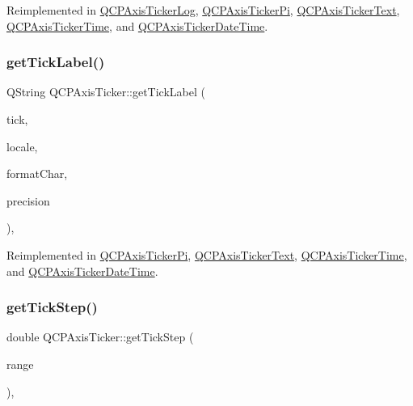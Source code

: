 Reimplemented in \mbox{\hyperlink{class_q_c_p_axis_ticker_log_a352fef7ae68837acd26e35188aa86167}{Q\+C\+P\+Axis\+Ticker\+Log}}, \mbox{\hyperlink{class_q_c_p_axis_ticker_pi_a56c90f870da97c8670cfae4d04ff3ac7}{Q\+C\+P\+Axis\+Ticker\+Pi}}, \mbox{\hyperlink{class_q_c_p_axis_ticker_text_a9c2488b877776870239abda4c8106052}{Q\+C\+P\+Axis\+Ticker\+Text}}, \mbox{\hyperlink{class_q_c_p_axis_ticker_time_acace84c46598176aa53837e147595471}{Q\+C\+P\+Axis\+Ticker\+Time}}, and \mbox{\hyperlink{class_q_c_p_axis_ticker_date_time_a78dece0d51426a3c310528d413e09193}{Q\+C\+P\+Axis\+Ticker\+Date\+Time}}.

\mbox{\label{class_q_c_p_axis_ticker_a8201eb4aa8be192bf786b126eb5ee089}} 
\subsubsection{\texorpdfstring{getTickLabel()}{getTickLabel()}}
{\footnotesize\ttfamily Q\+String Q\+C\+P\+Axis\+Ticker\+::get\+Tick\+Label (\begin{DoxyParamCaption}\item[{double}]{tick,  }\item[{const Q\+Locale \&}]{locale,  }\item[{Q\+Char}]{format\+Char,  }\item[{int}]{precision }\end{DoxyParamCaption})\hspace{0.3cm}{\ttfamily [protected]}, {\ttfamily [virtual]}}



Reimplemented in \mbox{\hyperlink{class_q_c_p_axis_ticker_pi_a9a087d931d4344b8a91d5cecceff7109}{Q\+C\+P\+Axis\+Ticker\+Pi}}, \mbox{\hyperlink{class_q_c_p_axis_ticker_text_a99247779a9c20bea1f50911117540a71}{Q\+C\+P\+Axis\+Ticker\+Text}}, \mbox{\hyperlink{class_q_c_p_axis_ticker_time_a046eb771bdf2a959f570db542b3a0be6}{Q\+C\+P\+Axis\+Ticker\+Time}}, and \mbox{\hyperlink{class_q_c_p_axis_ticker_date_time_a4dc6a03f7ea5c619477528a683ed5c18}{Q\+C\+P\+Axis\+Ticker\+Date\+Time}}.

\mbox{\label{class_q_c_p_axis_ticker_a910d69bcec2de37e92d8d4e1ecf201e2}} 
\subsubsection{\texorpdfstring{getTickStep()}{getTickStep()}}
{\footnotesize\ttfamily double Q\+C\+P\+Axis\+Ticker\+::get\+Tick\+Step (\begin{DoxyParamCaption}\item[{const \mbox{\hyperlink{class_q_c_p_range}{Q\+C\+P\+Range}} \&}]{range }\end{DoxyParamCaption})\hspace{0.3cm}{\ttfamily [protected]}, {\ttfamily [virtual]}}



